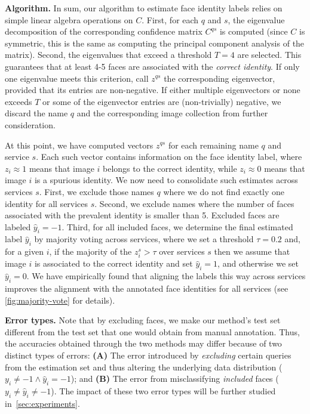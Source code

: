 \documentclass[10pt,twocolumn,letterpaper]{article}
\begin{document}
\textbf{Algorithm.}
In sum, our algorithm to estimate face identity labels relies on simple linear algebra operations on $C$. First, for each $q$ and $s$, the eigenvalue decomposition of the corresponding confidence matrix $C^{qs}$ is computed (since $C$ is symmetric, this is the same as computing the principal component analysis of the matrix). Second, the eigenvalues that exceed a threshold $T=4$ are selected. This guarantees that at least 4-5 faces are associated with the {\em correct identity}. If only one eigenvalue meets this criterion, call  $z^{qs}$ the corresponding eigenvector, provided that its entries are non-negative. If either multiple eigenvectors or none exceeds $T$ or some of the eigenvector entries are (non-trivially) negative, we discard the name $q$ and the corresponding image collection from further consideration.

At this point, we have computed vectors $z^{qs}$ for each remaining name $q$ and service $s$. Each such vector contains information on the face identity label, where $z_i \approx 1$ means that image $i$ belongs to the correct identity, while $z_i \approx 0$ means that image $i$ is a spurious identity. We now need to consolidate such estimates across services $s$.
First, we exclude those names $q$ where we do not find exactly one identity for all services $s$. Second, we exclude names where the number of faces associated with the prevalent identity is smaller than 5. Excluded faces are labeled $\hat{y}_i=-1$. Third, for all included faces, we determine the final estimated label $\hat{y}_i$ by majority voting across services, where we set a threshold $\tau = 0.2$ and, for a given $i$, if the majority of the $z_i^s > \tau$ over services $s$ then we assume that image $i$ is associated to the correct identity and set $\hat{y}_i=1$, and otherwise we set $\hat{y}_i=0$. We have empirically found that aligning the labels this way across services improves the alignment with the annotated face identities for all services (see \cref{fig:majority-vote} for details).

\vspace{0.75mm}
\textbf{Error types.}
Note that by excluding faces, we make our method's test set different from the test set that one would obtain from manual annotation. Thus, the accuracies obtained through the two methods may differ because of two distinct types of errors: \textbf{(A)} The error introduced by {\em excluding} certain queries from the estimation set and thus altering the underlying data distribution ($y_i \neq -1 \wedge \hat{y}_i=-1$); and \textbf{(B)} The error from misclassifying {\em included} faces ($y_i \neq \hat{y}_i \neq -1$). The impact of these two error types will be further studied in~\cref{sec:experiments}.
\end{document}
